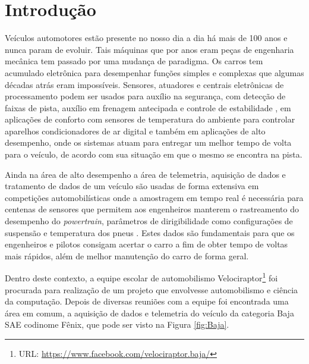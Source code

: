 \chapter{Introdução} 
	\label{ch:introducao}

Veículos automotores estão presente no nosso dia a dia há mais de 100 anos \cite{fordt} e nunca param de evoluir. Tais  máquinas que por anos eram peças de engenharia mecânica tem passado por uma mudança de paradigma. Os carros tem acumulado eletrônica para desempenhar funções simples e complexas que algumas décadas atrás eram impossíveis. Sensores, atuadores e centrais eletrônicas de processamento podem ser usados para auxílio na segurança, com detecção de faixas de pista, auxílio em frenagem antecipada e controle de estabilidade \cite{racecarInstrumentationFor2012}, em aplicações de conforto com sensores de temperatura do ambiente para controlar aparelhos condicionadores de ar digital e também em aplicações de alto desempenho, onde os sistemas atuam para entregar um melhor tempo de volta para o veículo, de acordo com sua situação em que o mesmo se encontra na pista.

Ainda na área de alto desempenho a área de telemetria, aquisição de dados e tratamento de dados de um veículo são usadas de forma extensiva em competições automobilísticas onde a amostragem em tempo real é necessária para centenas de sensores que permitem aos engenheiros manterem o rastreamento do desempenho do \textit{powertrain}, parâmetros de dirigibilidade como configurações de suspensão e temperatura dos pneus \cite{designAndImplementation2015}. Estes dados são fundamentais para que os engenheiros e pilotos consigam acertar o carro a fim de obter tempo de voltas mais rápidos, além de melhor manutenção do carro de forma geral.

Dentro deste contexto, a equipe escolar de automobilismo Velociraptor\footnote{URL: \url{https://www.facebook.com/velociraptor.baja/}} foi procurada para realização de um projeto que envolvesse automobilismo e ciência da computação. Depois de diversas reuniões com a equipe foi encontrada uma área em comum, a aquisição de dados e telemetria do veículo da categoria Baja SAE codinome Fênix, que pode ser visto na Figura \ref{fig:Baja}. 


